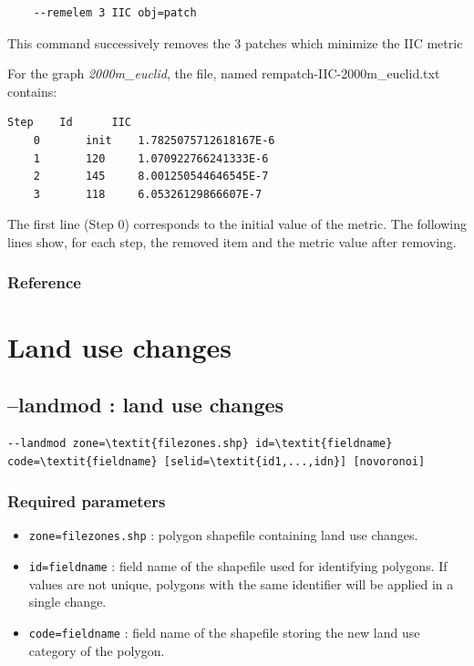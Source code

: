 \documentclass[a4paper,10pt]{report}
\begin{document}
\begin{Verbatim}
	--remelem 3 IIC obj=patch
\end{Verbatim}
This command  successively removes the 3 patches which minimize the IIC metric

For the graph \textit{2000m\_euclid}, the file, named rempatch-IIC-2000m\_euclid.txt contains:
\begin{Verbatim}[tabsize=4]
	Step	Id  	IIC
	0   	init	1.7825075712618167E-6
	1   	120 	1.070922766241333E-6
	2   	145 	8.001250544646545E-7
	3   	118 	6.05326129866607E-7
\end{Verbatim}
The first line (Step 0) corresponds to the initial value of the metric. The following lines show, for each step, the removed item and the metric value after removing.

\subsubsection{Reference}
\cite{2016_campagnole}


\section{Land use changes}
\subsection{--landmod : land use changes}

\begin{Verbatim}[commandchars=\\\{\}]
--landmod zone=\textit{filezones.shp} id=\textit{fieldname} code=\textit{fieldname} [selid=\textit{id1,...,idn}] [novoronoi]
\end{Verbatim}

\subsubsection{Required parameters}
\begin{itemize}
	\item \verb|zone=filezones.shp| : polygon shapefile containing land use changes.
	\item \verb|id=fieldname| : field name of the shapefile used for identifying polygons. If values are not unique, polygons with the same identifier will be applied in a single change.
	\item \verb|code=fieldname| : field name of the shapefile storing the new land use category of the polygon.
\end{itemize}
\end{document}
